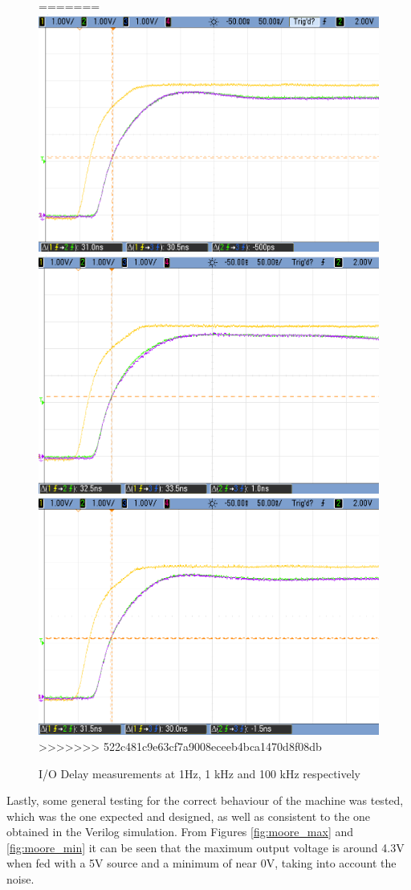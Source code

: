 \begin{figure}[H]
\begin{center}
=======
        \includegraphics[width=0.75\linewidth]{./images/e3e1_1.png}
        \includegraphics[width=0.75\linewidth]{./images/e3e1_1k.png}
        \includegraphics[width=0.75\linewidth]{./images/e3e1_100k_.png}
>>>>>>> 522c481c9e63cf7a9008eceeb4bca1470d8f08db
        \caption{I/O Delay measurements at 1Hz, 1 kHz and 100 kHz respectively}
        \label{fig:moore_delays}
    \end{center}
\end{figure}

Lastly, some general testing for the correct behaviour of the machine was tested, which was the one expected and
designed, as well as consistent to the one obtained in the Verilog simulation. From Figures \ref{fig:moore_max} and 
\ref{fig:moore_min} it can be seen that the maximum output voltage is around 4.3V when fed with a 5V source and a
minimum of near 0V, taking into account the noise.

